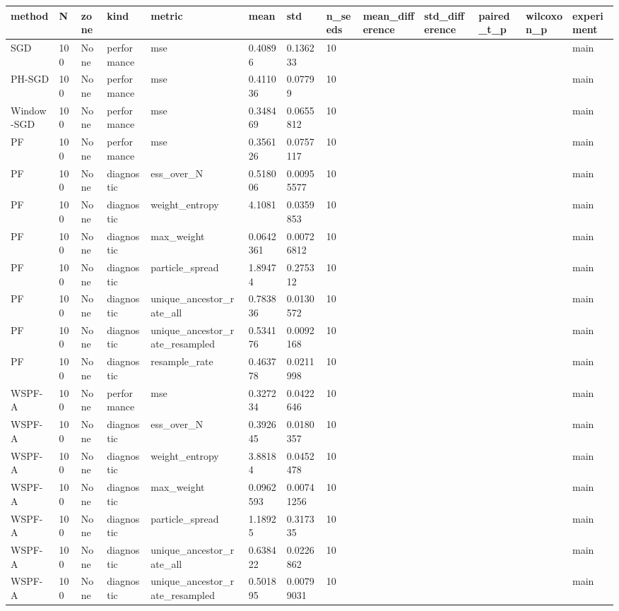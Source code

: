 \begin{tabular}{lllllllllllll}
\hline
method & N & zone & kind & metric & mean & std & n\_seeds & mean\_difference & std\_difference & paired\_t\_p & wilcoxon\_p & experiment \\
\hline
SGD & 100 & None & performance & mse & 0.40896 & 0.136233 & 10 &  &  &  &  & main \\
PH-SGD & 100 & None & performance & mse & 0.411036 & 0.07799 & 10 &  &  &  &  & main \\
Window-SGD & 100 & None & performance & mse & 0.348469 & 0.0655812 & 10 &  &  &  &  & main \\
PF & 100 & None & performance & mse & 0.356126 & 0.0757117 & 10 &  &  &  &  & main \\
PF & 100 & None & diagnostic & ess\_over\_N & 0.518006 & 0.00955577 & 10 &  &  &  &  & main \\
PF & 100 & None & diagnostic & weight\_entropy & 4.1081 & 0.0359853 & 10 &  &  &  &  & main \\
PF & 100 & None & diagnostic & max\_weight & 0.0642361 & 0.00726812 & 10 &  &  &  &  & main \\
PF & 100 & None & diagnostic & particle\_spread & 1.89474 & 0.275312 & 10 &  &  &  &  & main \\
PF & 100 & None & diagnostic & unique\_ancestor\_rate\_all & 0.783836 & 0.0130572 & 10 &  &  &  &  & main \\
PF & 100 & None & diagnostic & unique\_ancestor\_rate\_resampled & 0.534176 & 0.0092168 & 10 &  &  &  &  & main \\
PF & 100 & None & diagnostic & resample\_rate & 0.463778 & 0.0211998 & 10 &  &  &  &  & main \\
WSPF-A & 100 & None & performance & mse & 0.327234 & 0.0422646 & 10 &  &  &  &  & main \\
WSPF-A & 100 & None & diagnostic & ess\_over\_N & 0.392645 & 0.0180357 & 10 &  &  &  &  & main \\
WSPF-A & 100 & None & diagnostic & weight\_entropy & 3.88184 & 0.0452478 & 10 &  &  &  &  & main \\
WSPF-A & 100 & None & diagnostic & max\_weight & 0.0962593 & 0.00741256 & 10 &  &  &  &  & main \\
WSPF-A & 100 & None & diagnostic & particle\_spread & 1.18925 & 0.317335 & 10 &  &  &  &  & main \\
WSPF-A & 100 & None & diagnostic & unique\_ancestor\_rate\_all & 0.638422 & 0.0226862 & 10 &  &  &  &  & main \\
WSPF-A & 100 & None & diagnostic & unique\_ancestor\_rate\_resampled & 0.501895 & 0.00799031 & 10 &  &  &  &  & main \\

\end{tabular}

